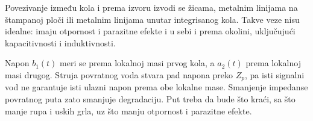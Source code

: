 Povezivanje između kola i prema izvoru izvodi se žicama, metalnim linijama na štampanoj ploči ili metalnim linijama unutar integrisanog kola. Takve veze nisu idealne: imaju otpornost i parazitne efekte i u sebi i prema okolini, uključujući kapacitivnosti i induktivnosti.

Napon $b_1(t)$ meri se prema lokalnoj masi prvog kola, a $a_2(t)$ prema lokalnoj masi drugog. Struja povratnog voda stvara pad napona preko $Z_p$, pa isti signalni vod ne garantuje isti ulazni napon prema obe lokalne mase. Smanjenje impedanse povratnog puta zato smanjuje degradaciju. Put treba da bude što kraći, sa što manje rupa i uskih grla, uz što manju otpornost i parazitne efekte.
